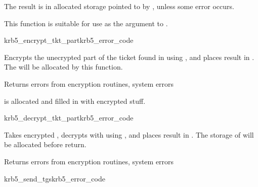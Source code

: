 The result is in allocated storage pointed to by
, unless some error occurs.

This function is suitable for use as the 
argument to .

\begin{funcdecl}{krb5_encrypt_tkt_part}{krb5_error_code}{\funcinout}
\funcin
{}
\funcinout
{}
\end{funcdecl}

\internalfunc

\begin{sloppypar}
Encrypts the unecrypted part of the ticket found in 
 using
, and places result in 
.
The  will be allocated by this
function.
\end{sloppypar}

Returns errors from encryption routines, system errors

 is allocated and filled in with
encrypted stuff.

\begin{funcdecl}{krb5_decrypt_tkt_part}{krb5_error_code}{\funcinout}
\funcin
{}
\funcinout
{}
\end{funcdecl}

\internalfunc

Takes encrypted , decrypts with
using , and places result in
.  The storage of
 will be allocated before return.

Returns errors from encryption routines, system errors

\begin{funcdecl}{krb5_send_tgs}{krb5_error_code}{\funcinout}
\funcin
{}
\funcinout
{}
\funcout
{}
\end{funcdecl}

